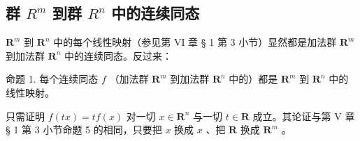 \subsection{\texorpdfstring{群 \(R^{m}\) 到群 \(R^{n}\) 中的连续同态}{群 R 的 m 次幂到群 R 的 n 次幂中的连续同态}}

\(\mathbf{R}^{m}\) 到 \(\mathbf{R}^{n}\) 中的每个线性映射（参见第 VI 章 § 1 第 3 小节）显然都是加法群 \(\mathbf{R}^{m}\) 到加法群 \(\mathbf{R}^{n}\) 中的连续同态。反过来：

命题 1. 每个连续同态 \(f\) （加法群 \(\mathbf{R}^m\) 到加法群 \(\mathbf{R}^n\) 中的）都是 \(\mathbf{R}^m\) 到 \(\mathbf{R}^n\) 中的线性映射。

只需证明 \(f(tx) = tf(x)\) 对一切 \(x \in \mathbf{R}^n\) 与一切 \(t \in \mathbf{R}\) 成立。其论证与第 V 章 § 1 第 3 小节命题 5 的相同，只要把 \(x\) 换成 \(x\) 、把 \(\mathbf{R}\) 换成 \(\mathbf{R}^m\) 。

